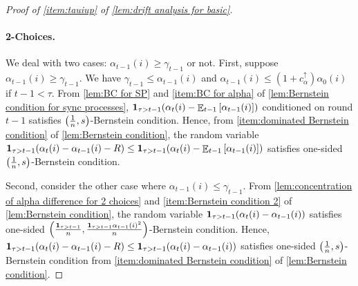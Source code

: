 \documentclass[letterpaper,11pt]{article}
\newcommand{\indicator}{\mathbf{1}}
\DeclareMathOperator*{\E}{\mathbb{E}}
\newcommand{\alphanorm}{\gamma}
\newcommand{\variance}{s}
\newcommand{\ciup}{c_\alpha^{\uparrow}}
\begin{document}
\begin{proof}[Proof of \cref{item:tauiup} of \cref{lem:drift analysis for basic}]
    \paragraph*{2-Choices.}
    We deal with two cases: $\alpha_{t-1}(i)\geq \alphanorm_{t-1}$ or not.
    First, suppose $\alpha_{t-1}(i)\geq \alphanorm_{t-1}$.
    We have $\alphanorm_{t-1}\leq \alpha_{t-1}(i)$ and $\alpha_{t-1}(i) \le (1+\ciup)\alpha_0(i)$ if $ t-1 < \tau $.
    From \cref{lem:BC for SP} and \cref{item:BC for alpha} of \cref{lem:Bernstein condition for sync processes},
    $\indicator_{\tau>t-1}\qty(\alpha_t(i)-\E_{t-1}\qty[ \alpha_{t-1}(i)])$ conditioned on round $t-1$ satisfies  $\qty(\frac{1}{n},\variance)$-Bernstein condition.
    Hence, from \cref{item:dominated Bernstein condition} of \cref{lem:Bernstein condition}, the random variable
    $\indicator_{\tau>t-1}\qty(\alpha_t(i)-\alpha_{t-1}(i)-R)\leq \indicator_{\tau>t-1}\qty(\alpha_t(i)-\E_{t-1}\qty[ \alpha_{t-1}(i)])$ satisfies one-sided $\qty(\frac{1}{n},\variance)$-Bernstein condition.
    

    Second, consider the other case where $\alpha_{t-1}(i)\leq \alphanorm_{t-1}$.
    From \cref{lem:concentration of alpha difference for 2 choices} and \cref{item:Bernstein condition 2} of \cref{lem:Bernstein condition},
    the random variable $\indicator_{\tau>t-1}\qty(\alpha_t(i)-\alpha_{t-1}(i))$ satisfies one-sided $\qty(\frac{\indicator_{\tau>t-1}}{n},\frac{\indicator_{\tau>t-1}\alpha_{t-1}(i)^2}{n})$-Bernstein condition.
    Hence, $\indicator_{\tau>t-1}\qty(\alpha_t(i)-\alpha_{t-1}(i)-R)\leq \indicator_{\tau>t-1}\qty(\alpha_t(i)-\alpha_{t-1}(i))$ satisfies one-sided $\qty(\frac{1}{n}, \variance)$-Bernstein condition from \cref{item:dominated Bernstein condition} of \cref{lem:Bernstein condition}.
    

\end{proof}
\end{document}
